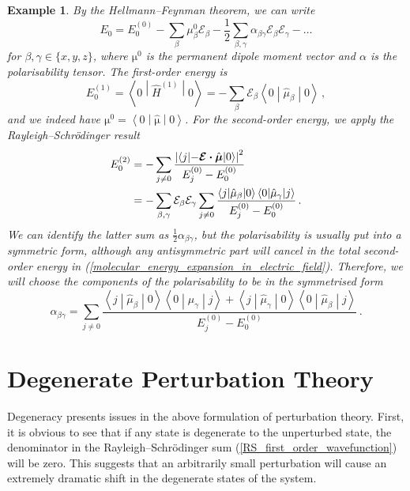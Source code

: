 \documentclass{article}
\theoremstyle{plain}\theoremheaderfont{\normalfont\itshape}\theorembodyfont{\rmfamily}\theoremseparator{.}\newtheorem*{rem}{Remark}\newtheorem*{ex}{Example}\newtheorem*{proof}{Proof}\newtheorem*{altp}{Alternative proof}
\theoremstyle{plain}\theoremheaderfont{\normalfont\bfseries}\theorembodyfont{\rmfamily}\theoremseparator{.}\newtheorem{thm}{Theorem}[section]\newtheorem{lem}[thm]{Lemma}\newtheorem{prop}[thm]{Proposition}\newtheorem*{cor}{Corollary}\newtheorem{defn}[thm]{Definition}\newtheorem{clm}[thm]{Claim}\newtheorem{clminproof}{Claim}
\theoremstyle{break}\theoremheaderfont{\normalfont\itshape}\theorembodyfont{\rmfamily}\theoremseparator{.\medskip}\newtheorem*{proofskip}{Proof}\newtheorem*{exs}{Examples}\newtheorem*{rems}{Remarks}
\theoremstyle{break}\theoremheaderfont{\normalfont\bfseries}\theorembodyfont{\rmfamily}\theoremseparator{.\medskip}\newtheorem{lemskip}[thm]{Lemma}\newtheorem{defnskip}[thm]{Definition}\newtheorem{propskip}[thm]{Proposition}\newtheorem{thmskip}[thm]{Theorem}
\numberwithin{equation}{section}
\newcommand{\mel}[3]{\left\langle #1 \middle| #2 \middle| #3 \right\rangle}
\newcommand{\vb}[1]{\bm{\mathrm{#1}}}
\newcommand{\vdot}{\bm{\cdot}}
\newcommand{\abs}[1]{\left| #1 \right|}
\begin{document}
\begin{ex}
        By the Hellmann--Feynman theorem, we can write
        \begin{equation}\label{molecular_energy_expansion_in_electric_field}
            E_0=E_0^{(0)}-\sum_\beta\mu_\beta^0\mathcal{E}_\beta-\frac{1}{2}\sum_{\beta,\gamma}\alpha_{\beta\gamma}\mathcal{E}_\beta\mathcal{E}_\gamma-\dots
        \end{equation}
        for \(\beta,\gamma\in\{x,y,z\}\), where \(\vb{\mu}^0\) is the permanent dipole moment vector and \(\alpha\) is the polarisability tensor. The first-order energy is
        \begin{equation}
            E_0^{(1)}=\mel{0}{\hat{H}^{(1)}}{0}=-\sum_\beta\mathcal{E}_\beta\mel{0}{\hat{\mu}_\beta}{0}\,,
        \end{equation}
        and we indeed have \(\vb{\mu}^0=\mel{0}{\hat{\vb{\mu}}}{0}\). For the second-order energy, we apply the Rayleigh--Schr\"{o}dinger result
        \begin{align}
            E_0^{(2)}&=-\sum_{j\ne 0}\frac{\abs{\mel{j}{-\vb{\mathcal{E}}\vdot\hat{\vb{\mu}}}{0}}^2}{E_j^{(0)}-E_0^{(0)}}\notag\\
            &=-\sum_{\beta,\gamma}\mathcal{E}_\beta\mathcal{E}_\gamma\sum_{j\ne 0}\frac{\mel{j}{\hat{\mu}_\beta}{0}\mel{0}{\hat{\mu}_\gamma}{j}}{E_j^{(0)}-E_0^{(0)}}\,.
        \end{align}
        We can identify the latter sum as \(\frac{1}{2}\alpha_{\beta\gamma}\), but the polarisability is usually put into a symmetric form, although any antisymmetric part will cancel in the total second-order energy in (\ref{molecular_energy_expansion_in_electric_field}). Therefore, we will choose the components of the polarisability to be in the symmetrised form
        \begin{equation}\label{molecular_polarisability}
            \alpha_{\beta\gamma}=\sum_{j\ne 0}\frac{\mel{j}{\hat{\mu}_\beta}{0}\mel{0}{\hat{\mu}_\gamma}{j}+\mel{j}{\hat{\mu}_\gamma}{0}\mel{0}{\hat{\mu}_\beta}{j}}{E_j^{(0)}-E_0^{(0)}}\,.
        \end{equation}
    \end{ex}

    \newpage
    \section{Degenerate Perturbation Theory}
    Degeneracy presents issues in the above formulation of perturbation theory. First, it is obvious to see that if any state is degenerate to the unperturbed state, the denominator in the Rayleigh--Schr\"{o}dinger sum (\ref{RS_first_order_wavefunction}) will be zero. This suggests that an arbitrarily small perturbation will cause an extremely dramatic shift in the degenerate states of the system.
\end{document}
